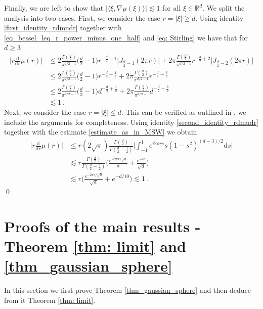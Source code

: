 \documentclass[a4paper, reqno]{amsart}
\theoremstyle{definition}
\newcommand{\dd}{{\mathrm d}}
\begin{document}
Finally, we are left to show that $|\langle \xi, \nabla \mu(\xi) \rangle|\lesssim 1$ for all $\xi\in\mathbb{R}^d$. 
We split the analysis into two cases. First, we consider the case $r=|\xi|\geq d$. Using identity \eqref{first_identity_rdmudr} together with \eqref{eq_bessel_leq_r_power_minus_one_half} and \eqref{eq: Stirling} we have that for $d\geq 3$ 
\begin{align*}
   \bigg| r\frac{\dd}{\dd r} \mu(r)\bigg|& \leq 2 \frac{\Gamma(\tfrac{d}{2})}{\pi^{d/2-1}}\big(\tfrac{d}{2}-1 \big) r^{-\tfrac{d}{2}+1}\big| J_{\tfrac{d}{2}-1}(2\pi r)\big| + 2\pi \frac{\Gamma(\tfrac{d}{2})}{\pi^{d/2-1}}r^{-\tfrac{d}{2}+2}\big|J_{\tfrac{d}{2}-2}(2\pi r)\big|\\
   & \leq 2 \frac{\Gamma(\tfrac{d}{2})}{\pi^{d/2-1}}\big(\tfrac{d}{2}-1 \big) r^{-\tfrac{d}{2}+\tfrac{1}{2}} + 2\pi \frac{\Gamma(\tfrac{d}{2})}{\pi^{d/2-1}}r^{-\tfrac{d}{2}+\tfrac{3}{2}}\\
   & \leq 2 \frac{\Gamma(\tfrac{d}{2})}{\pi^{d/2-1}}\big(\tfrac{d}{2}-1 \big) d^{-\tfrac{d}{2}+\tfrac{1}{2}} + 2\pi \frac{\Gamma(\tfrac{d}{2})}{\pi^{d/2-1}}d^{-\tfrac{d}{2}+\tfrac{3}{2}}\\
   & \lesssim 1~.
\end{align*}
Next, we consider the case $r=|\xi|\leq d$. This can be verified as outlined in \cite[Remark~5.1]{MSW24}, we include the arguments for completeness. Using identity \eqref{second_identity_rdmudr} together with the estimate \eqref{estimate_as_in_MSW} we obtain 
\begin{align*}
    \bigg| r\frac{\dd}{\dd r} \mu(r)\bigg|& \leq r (2\sqrt{\pi}) \frac{\Gamma(\tfrac{d}{2})}{\Gamma(\tfrac{d}{2}-\tfrac{1}{2})}  \bigg| \int_{-1}^1 e^{i2\pi rs}s(1-s^2)^{(d-3)/2}\dd s \bigg| \\
    & \lesssim  r \frac{\Gamma(\tfrac{d}{2})}{\Gamma(\tfrac{d}{2}-\tfrac{1}{2})}  \bigg(\frac{e^{-2\pi r/\sqrt{d}}}{d}+\frac{e^{-cd}}{\sqrt{d}}\bigg) \\
    & \lesssim r \bigg(\frac{e^{-2\pi r/\sqrt{d}}}{\sqrt{d}}+e^{-d/10}\bigg)\lesssim 1~.
\end{align*}
\qed




\section{ Proofs of the main results - Theorem \ref{thm: limit} and \ref{thm_gaussian_sphere}}
\label{sec: proof main}

In this section we first prove Theorem \ref{thm_gaussian_sphere} and then deduce from it Theorem \ref{thm: limit}.
\end{document}
